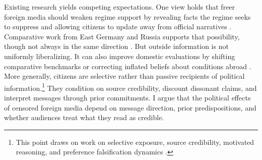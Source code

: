 \documentclass[12pt,american]{article}
\begin{document}
	Existing research yields competing expectations. One view holds that freer foreign media should weaken regime support by revealing facts the regime seeks to suppress and allowing citizens to update away from official narratives \citep{BesleyPrat2006,EgorovGurievSonin2009,gurievtreisman2019,chenyang2019}. Comparative work from East Germany and Russia supports that possibility, though not always in the same direction \citep{KernHainmueller2009,EnikolopovPetrovaZhuravskaya2011}. But outside information is not uniformly liberalizing. It can also improve domestic evaluations by shifting comparative benchmarks or correcting inflated beliefs about conditions abroad \citep{bursztynyang2022,DuchStevenson2008,hobbsroberts2018,huang2015international,huangyeh2017,KayserPeress2012}. More generally, citizens are selective rather than passive recipients of political information.\footnote{This point draws on work on selective exposure, source credibility, motivated reasoning, and preference falsification dynamics \citep{BakshyMessingAdamic2015,Druckman2001,GentzkowShapiro2006,Kuran1995,Levendusky2013,LupiaMcCubbins1998CUP,Prior2007CUP,taberlodge2006,wangwestwood2024,zaller1992}.} They condition on source credibility, discount dissonant claims, and interpret messages through prior commitments. I argue that the political effects of censored foreign media depend on message direction, prior predispositions, and whether audiences treat what they read as credible.
	
\end{document}
